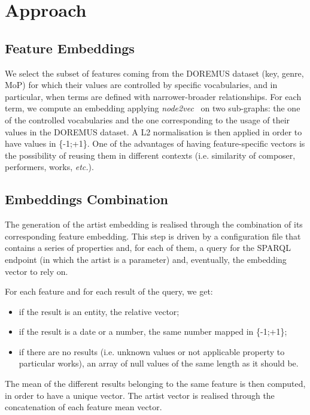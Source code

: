\documentclass{article}
\newcommand{\etc}{\textit{etc.}}
\begin{document}

\section{Approach}\label{sec:approach}

\subsection{Feature Embeddings}\label{sec:feat_emb}
We select the subset of features coming from the DOREMUS dataset (key, genre, MoP) for which their values are controlled by specific vocabularies, and in particular, when terms are defined with narrower-broader relationships. For each term, we compute an embedding applying \textit{node2vec}~\cite{node2vec-kdd2016} on two sub-graphs: the one of the controlled vocabularies and the one corresponding to the usage of their values in the DOREMUS dataset. A L2 normalisation is then applied in order to have values in \{-1;+1\}. One of the advantages of having feature-specific vectors is the possibility of reusing them in different contexts (i.e. similarity of composer, performers, works, \etc).

\subsection{Embeddings Combination}\label{sec:emb_comb}
The generation of the artist embedding is realised through the combination of its corresponding feature embedding. This step is driven by a configuration file that contains a series of properties and, for each of them, a query for the SPARQL endpoint (in which the artist is a parameter) and, eventually, the embedding vector to rely on.

For each feature and for each result of the query, we get: 
\begin{itemize}[nolistsep]
    \item if the result is an entity, the relative vector;
    \item if the result is a date or a number, the same number mapped in \{-1;+1\};
    \item if there are no results (i.e. unknown values or not applicable property to particular works), an array of null values of the same length as it should be.
\end{itemize}

The mean of the different results belonging to the same feature is then computed, in order to have a unique vector. The artist vector is realised through the concatenation of each feature mean vector.
\end{document}
